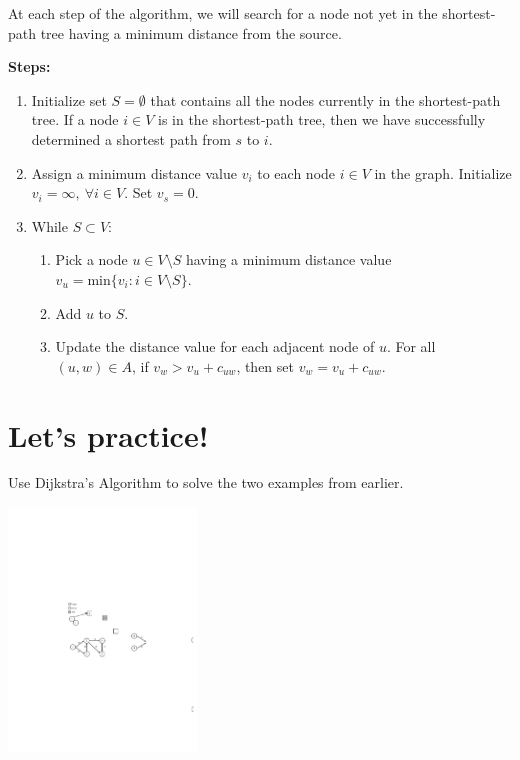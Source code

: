 \documentclass[12pt]{article}
\theoremstyle{definition}
\begin{document}
At each step of the algorithm, we will search for a node not yet in the shortest-path tree having a minimum distance from the source.

\vfill

\newpage

\textbf{Steps:}
\begin{enumerate}
	\item Initialize set $S = \emptyset$ that contains all the nodes currently in the shortest-path tree. If a node $i \in V$ is in the shortest-path tree, then we have successfully determined a shortest path from $s$ to $i$.

	\item Assign a minimum distance value $v_i$ to each node $i \in V$ in the graph. Initialize $v_i = \infty, \ \forall i \in V$. Set $v_s = 0$.

	\item While $S \subset V$:
	\begin{enumerate}
		\item Pick a node $u \in V \setminus S$ having a minimum distance value $v_u = \textrm{min} \{v_i: i \in V\setminus S\}$.
		\item Add $u$ to $S$. 
		\item Update the distance value for each adjacent node of $u$. For all $(u,w) \in A$, if $v_w > v_u + c_{uw}$, then set $v_w = v_u + c_{uw}$. 
	\end{enumerate}
\end{enumerate}

\newpage

\section*{Let's practice!}

Use Dijkstra's Algorithm to solve the two examples from earlier.

\begin{center}
\includegraphics[width=5cm]{shortestpathexample1}
\end{center}
\vfill
\end{document}
